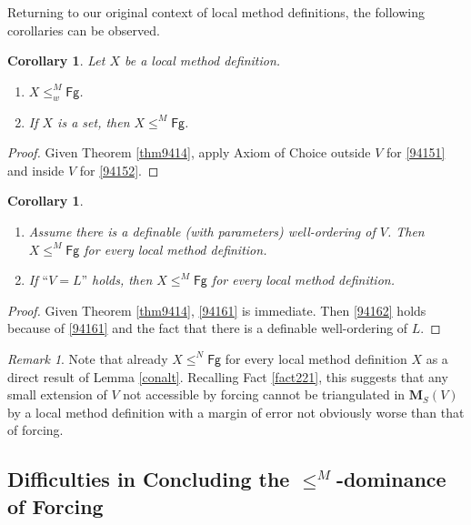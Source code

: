 \documentclass[12pt, twoside]{memoir}
\numberwithin{equation}{section}
\newtheorem{cor}[thm]{Corollary}
\theoremstyle{definition}
\theoremstyle{remark}
\newtheorem{rem}[thm]{Remark}
\theoremstyle{definition}
\theoremstyle{definition}
\theoremstyle{definition}
\theoremstyle{remark}
\begin{document}
Returning to our original context of local method definitions, the following corollaries can be observed.

\begin{cor}\label{cor9417}
Let $X$ be a local method definition.
\begin{enumerate}[label=(\arabic*)]
    \item\label{94151} $X \leq^M_w \mathsf{Fg}$.
    \item\label{94152} If $X$ is a set, then $X \leq^M \mathsf{Fg}$.
\end{enumerate}
\end{cor}

\begin{proof}
Given Theorem \ref{thm9414}, apply Axiom of Choice outside $V$ for \ref{94151} and inside $V$ for \ref{94152}.
\end{proof}

\begin{cor}
\leavevmode 
\begin{enumerate}[label=(\arabic*)]
    \item\label{94161} Assume there is a definable (with parameters) well-ordering of $V$. Then $X \leq^M \mathsf{Fg}$ for every local method definition.
    \item\label{94162} If $\text{``}V = L\text{''}$ holds, then $X \leq^M \mathsf{Fg}$ for every local method definition.
\end{enumerate}
\end{cor}

\begin{proof}
Given Theorem \ref{thm9414}, \ref{94161} is immediate. Then \ref{94162} holds because of \ref{94161} and the fact that there is a definable well-ordering of $L$.
\end{proof}

\begin{rem}\label{rem9414}
Note that already $X \leq^N \mathsf{Fg}$ for every local method definition $X$ as a direct result of Lemma \ref{conalt}. Recalling Fact \ref{fact221}, this suggests that any small extension of $V$ not accessible by forcing cannot be triangulated in $\mathbf{M}_S(V)$ by a local method definition with a margin of error not obviously worse than that of forcing.
\end{rem}

\subsection{Difficulties in Concluding the \texorpdfstring{$\leq^M$-dominance}{M-reducibility Dominance} of Forcing}
\end{document}
